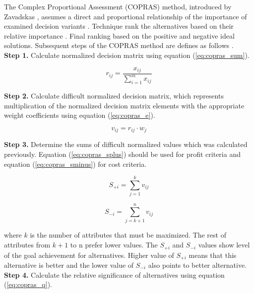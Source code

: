The Complex Proportional Assessment (COPRAS) method, introduced by Zavadskas \cite{bausys2015application}, assumes a direct and proportional relationship of the importance of examined decision variants \cite{yazdani2017analysis}. Technique rank the alternatives based on their relative importance \cite{kildiene2011copras}. Final ranking based on the positive and negative ideal solutions. Subsequent steps of the COPRAS method are defines as follows \cite{aghdaie2012prioritizing}. \\

\noindent \textbf{Step 1.} Calculate normalized decision matrix using equation (\ref{eq:copras_sum}).

\begin{equation}
    r_{i j}=\frac{x_{i j}}{\sum_{i=1}^{m} x_{i j}}
\label{eq:copras_sum}
\end{equation}


\noindent \textbf{Step 2.} Calculate difficult normalized decision matrix, which represents multiplication of the normalized decision matrix elements with the appropriate weight coefficients using equation (\ref{eq:copras_e}).

\begin{equation}
    v_{ij} = r_{ij} \cdot w_j
\label{eq:copras_e}
\end{equation}

\noindent \textbf{Step 3.} Determine the sums of difficult normalized values which was calculated previously. Equation (\ref{eq:copras_splus}) should be used for profit criteria and equation (\ref{eq:copras_sminus}) for cost criteria.

\begin{equation}
    S_{+i}=\sum_{j=1}^{k} v_{i j}
\label{eq:copras_splus}
\end{equation}

\begin{equation}
    S_{-i}=\sum_{j=k+1}^{n} v_{i j}
\label{eq:copras_sminus}
\end{equation}

where $k$ is the number of attributes that must be maximized. The rest of attributes from $k+1$ to n prefer
lower values. The $S_{+i}$ and $S_{-i}$ values show level of the goal achievement for alternatives. Higher
value of $S_{+i}$ means that this alternative is better and the lower value of $S_{-i}$ also points to
better alternative. \\

\noindent \textbf{Step 4.} Calculate the relative significance of alternatives using equation (\ref{eq:copras_q}).

